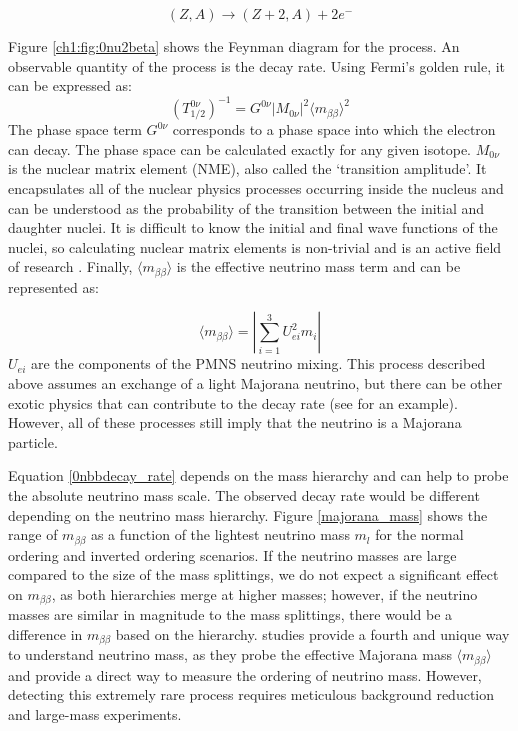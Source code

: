 \begin{equation}\label{0nbeta_decay_eq}
(Z,A) \rightarrow (Z+2,A) + 2e^-
\end{equation}




Figure \ref{ch1:fig:0nu2beta} shows the Feynman diagram for the process. An observable quantity of the process is the decay rate. Using Fermi's golden rule, it can be expressed as:
\begin{equation}\label{0nbbdecay_rate}
(T^{0\nu}_{1/2})^{-1} = G^{0\nu}\left|M_{0\nu}\right|^2\langle m_{\beta\beta}\rangle^2
\end{equation}
\noindent
The phase space term $G^{0\nu}$ corresponds to a phase space into which the electron can decay. The phase space can be calculated exactly for any given isotope. $M_{0\nu}$ is the nuclear matrix element (NME), also called the `transition amplitude'. It encapsulates all of the nuclear physics processes occurring inside the nucleus and can be understood as the probability of the transition between the initial and daughter nuclei. It is difficult to know the initial and final wave functions of the nuclei, so calculating nuclear matrix elements is non-trivial and is an active field of research \cite{Menendez:2017fdf}. Finally, $\langle m_{\beta\beta}\rangle$ is the effective neutrino mass term and can be represented as:

\begin{equation}\label{effective_mjd_mass}
\langle m_{\beta\beta}\rangle =  \left|\sum_{i=1}^{3} U^2_{ei}m_i\right|
\end{equation}
\noindent
$U_{ei}$ are the components of the PMNS neutrino mixing. This process described above assumes an exchange of a light Majorana neutrino, but there can be other exotic physics that can contribute to the decay rate (see \cite{Schechter_1982} for an example). However, all of these processes still imply that the neutrino is a Majorana particle.

Equation \ref{0nbbdecay_rate} depends on the mass hierarchy and can help to probe the absolute neutrino mass scale. The observed decay rate would be different depending on the neutrino mass hierarchy. Figure \ref{majorana_mass} shows the range of $m_{\beta\beta}$ as a function of the lightest neutrino mass $m_l$ for the normal ordering and inverted ordering scenarios. If the neutrino masses are large compared to the size of the mass splittings, we do not expect a significant effect on $m_{\beta\beta}$, as both hierarchies merge at higher masses; however, if the neutrino masses are similar in magnitude to the mass splittings, there would be a difference in $m_{\beta\beta}$ based on the hierarchy. {\onbb} studies provide a fourth and unique way to understand neutrino mass, as they probe the effective Majorana mass $\langle m_{\beta\beta}\rangle$ and provide a direct way to measure the ordering of neutrino mass. However, detecting this extremely rare process requires meticulous background reduction and large-mass experiments.

